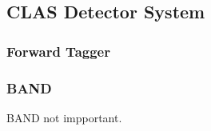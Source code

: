 \subsection{CLAS Detector System}
        
        
        
    \subsubsection{Forward Tagger}
    \subsubsection{BAND}
        BAND not impportant.